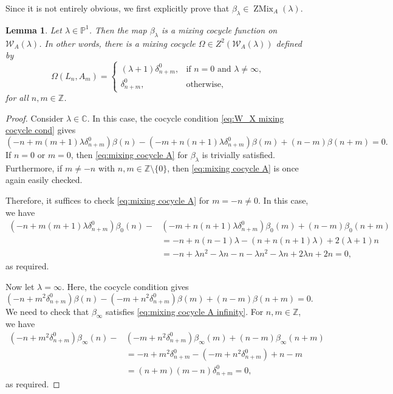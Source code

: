 \documentclass[11pt, svgnames]{amsart}
\newcommand{\ZZ}{\mathbb{Z}}
\newcommand{\CC}{\mathbb{C}}
\newcommand{\PP}{\mathbb{P}}
\newcommand{\W}{\mathcal{W}}
\DeclareMathOperator{\ZMix}{ZMix}
\newcommand{\nonzero}{\setminus \{0\}}
\newtheorem{lemma}[proposition]{Lemma}
\theoremstyle{definition}
\begin{document}
Since it is not entirely obvious, we first explicitly prove that $\beta_\lambda \in \ZMix_A(\lambda)$.

\begin{lemma}\label{lem:mixing cocycle function A}
    Let $\lambda \in \PP^1$. Then the map $\beta_\lambda$ is a mixing cocycle function on $\W_A(\lambda)$. In other words, there is a mixing cocycle $\Omega \in Z^2(\W_A(\lambda))$ defined by
    $$\Omega(L_n,A_m) = \begin{cases}
        (\lambda + 1)\delta_{n+m}^0, &\text{if } n = 0 \text{ and } \lambda \neq \infty, \\
        \delta_{n+m}^0, &\text{otherwise},
    \end{cases}$$
    for all $n,m \in \ZZ$.
\end{lemma}
\begin{proof}
    Consider $\lambda \in \CC$. In this case, the cocycle condition \eqref{eq:W_X mixing cocycle cond} gives
    \begin{equation}\label{eq:mixing cocycle A}
        (-n + m(m + 1)\lambda \delta_{n+m}^0)\beta(n) - (-m + n(n + 1)\lambda \delta_{n+m}^0)\beta(m) + (n - m)\beta(n + m) = 0.
    \end{equation}
    If $n = 0$ or $m = 0$, then \eqref{eq:mixing cocycle A} for $\beta_\lambda$ is trivially satisfied. Furthermore, if $m \neq -n$ with $n,m \in \ZZ \nonzero$, then \eqref{eq:mixing cocycle A} is once again easily checked.
    
    Therefore, it suffices to check \eqref{eq:mixing cocycle A} for $m = -n \neq 0$. In this case, we have
    \begin{align*}
        (-n + m(m + 1)\lambda \delta_{n+m}^0)\beta_0(n) - &(-m + n(n + 1)\lambda \delta_{n+m}^0)\beta_0(m) + (n - m)\beta_0(n + m) \\
        &= -n + n(n - 1)\lambda - (n + n(n + 1)\lambda) + 2(\lambda + 1)n \\
        &= -n + \lambda n^2 - \lambda n - n - \lambda n^2 - \lambda n + 2\lambda n + 2n = 0,
    \end{align*}
    as required.

    Now let $\lambda = \infty$. Here, the cocycle condition gives
    \begin{equation}\label{eq:mixing cocycle A infinity}
        (-n + m^2\delta_{n+m}^0)\beta(n) - (-m + n^2\delta_{n+m}^0)\beta(m) + (n - m)\beta(n + m) = 0.
    \end{equation}
    We need to check that $\beta_\infty$ satisfies \eqref{eq:mixing cocycle A infinity}. For $n,m \in \ZZ$, we have
    \begin{align*}
        (-n + m^2\delta_{n+m}^0)\beta_\infty(n) - &(-m + n^2\delta_{n+m}^0)\beta_\infty(m) + (n - m)\beta_\infty(n + m) \\
        &= -n + m^2\delta_{n+m}^0 - (-m + n^2\delta_{n+m}^0) + n - m \\
        &= (n + m)(m - n)\delta_{n+m}^0 = 0,
    \end{align*}
    as required.
\end{proof}
\end{document}
